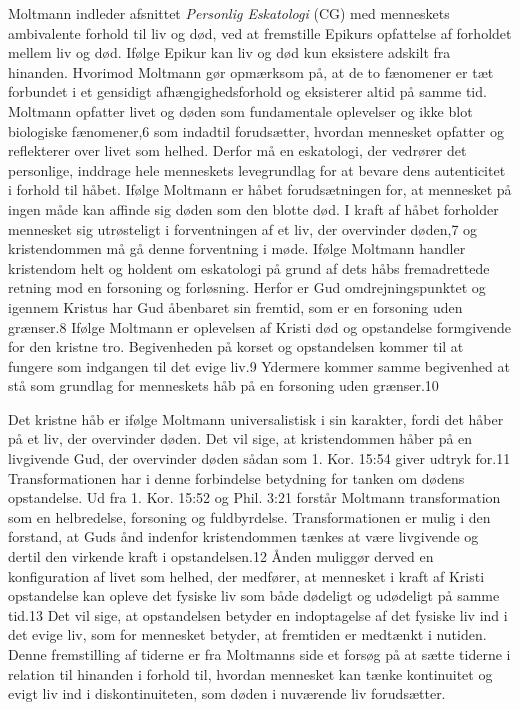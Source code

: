 Moltmann indleder afsnittet \textit{Personlig Eskatologi} (CG) med menneskets ambivalente forhold til liv og død, ved at fremstille Epikurs opfattelse af forholdet mellem liv og død. Ifølge Epikur kan liv og død kun eksistere adskilt fra hinanden. Hvorimod Moltmann gør opmærksom på, at de to fænomener er tæt forbundet i et gensidigt afhængighedsforhold og eksisterer altid på samme tid. Moltmann opfatter livet og døden som fundamentale oplevelser og ikke blot biologiske fænomener,6 som indadtil forudsætter, hvordan mennesket opfatter og reflekterer over livet som helhed. Derfor må en eskatologi, der vedrører det personlige, inddrage hele menneskets levegrundlag for at bevare dens autenticitet i forhold til håbet. Ifølge Moltmann er håbet forudsætningen for, at mennesket på ingen måde kan affinde sig døden som den blotte død. I kraft af håbet forholder mennesket sig utrøsteligt i forventningen af et liv, der overvinder døden,7 og kristendommen må gå denne forventning i møde. Ifølge Moltmann handler kristendom helt og holdent om eskatologi på grund af dets håbs fremadrettede retning mod en forsoning og forløsning. Herfor er Gud omdrejningspunktet og igennem Kristus har Gud åbenbaret sin fremtid, som er en forsoning uden grænser.8 Ifølge Moltmann er oplevelsen af Kristi død og opstandelse formgivende for den kristne tro. Begivenheden på korset og opstandelsen kommer til at fungere som indgangen til det evige liv.9 Ydermere kommer samme begivenhed at stå som grundlag for menneskets håb på en forsoning uden grænser.10

Det kristne håb er ifølge Moltmann universalistisk i sin karakter, fordi det håber på et liv, der overvinder døden. Det vil sige, at kristendommen håber på en livgivende Gud, der overvinder døden sådan som 1. Kor. 15:54 giver udtryk for.11  Transformationen har i denne forbindelse betydning for tanken om dødens opstandelse. Ud fra 1. Kor. 15:52 og Phil. 3:21 forstår Moltmann transformation som en helbredelse, forsoning og fuldbyrdelse. Transformationen er mulig i den forstand, at Guds ånd indenfor kristendommen tænkes at være livgivende og dertil den virkende kraft i opstandelsen.12 Ånden muliggør derved en konfiguration af livet som helhed, der medfører, at mennesket i kraft af Kristi opstandelse kan opleve det fysiske liv som både dødeligt og udødeligt på samme tid.13 Det vil sige, at opstandelsen betyder en indoptagelse af det fysiske liv ind i det evige liv, som for mennesket betyder, at fremtiden er medtænkt i nutiden. Denne fremstilling af tiderne er fra Moltmanns side et forsøg på at sætte tiderne i relation til hinanden i forhold til, hvordan mennesket kan tænke kontinuitet og evigt liv ind i diskontinuiteten, som døden i nuværende liv forudsætter.

